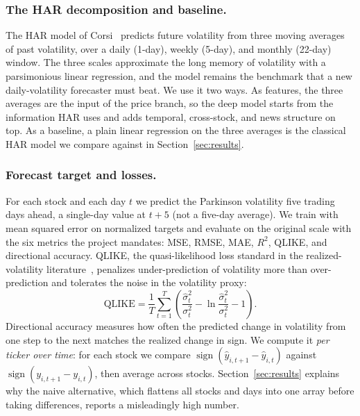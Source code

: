 \documentclass[runningheads]{llncs}
\begin{document}
\subsubsection{The HAR decomposition and baseline.}
The HAR model of Corsi~\cite{corsi2009} predicts future volatility from three moving averages of
past volatility, over a daily (1-day), weekly (5-day), and monthly (22-day) window. The three
scales approximate the long memory of volatility with a parsimonious linear regression, and the
model remains the benchmark that a new daily-volatility forecaster must beat. We use it two ways.
As features, the three averages are the input of the price branch, so the deep model starts from the
information HAR uses and adds temporal, cross-stock, and news structure on top. As a baseline, a
plain linear regression on the three averages is the classical HAR model we compare against in
Section~\ref{sec:results}.

\subsubsection{Forecast target and losses.}
For each stock and each day $t$ we predict the Parkinson volatility five trading days ahead, a
single-day value at $t+5$ (not a five-day average). We train with mean squared error on
normalized targets and evaluate on the original scale with the six metrics the project mandates:
MSE, RMSE, MAE, $R^2$, QLIKE, and directional accuracy. QLIKE, the quasi-likelihood loss standard
in the realized-volatility literature~\cite{patton2011}, penalizes under-prediction of volatility
more than over-prediction and tolerates the noise in the volatility proxy:
\begin{equation}
\text{QLIKE} = \frac{1}{T}\sum_{t=1}^{T}\left(\frac{\hat{\sigma}^2_t}{\sigma^2_t}
 - \ln\frac{\hat{\sigma}^2_t}{\sigma^2_t} - 1\right).
\label{eq:qlike}
\end{equation}
Directional accuracy measures how often the predicted change in volatility from one step to the
next matches the realized change in sign. We compute it \emph{per ticker over time}: for each
stock we compare $\operatorname{sign}(\hat{y}_{i,t+1}-\hat{y}_{i,t})$ against
$\operatorname{sign}(y_{i,t+1}-y_{i,t})$, then average across stocks. Section~\ref{sec:results}
explains why the naive alternative, which flattens all stocks and days into one array before taking
differences, reports a misleadingly high number.

\end{document}
